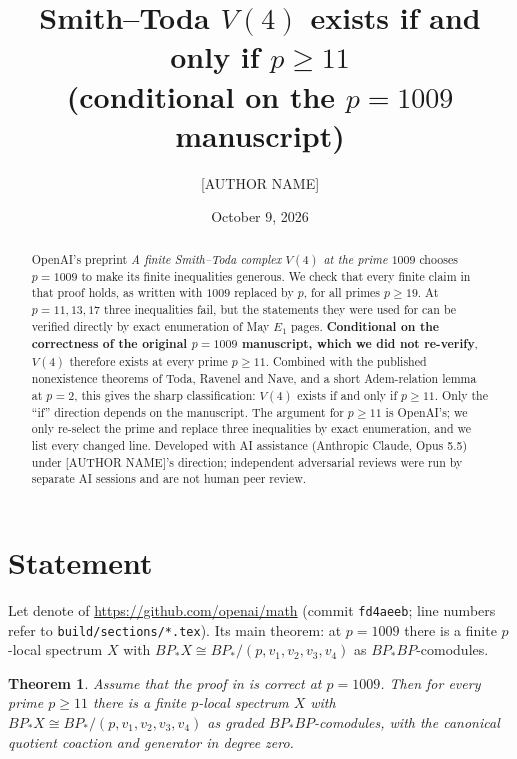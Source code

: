 \documentclass[11pt]{amsart}
\title{Smith--Toda $V(4)$ exists if and only if $p\ge11$\\ (conditional on the $p=1009$ manuscript)}
\author{[AUTHOR NAME]}
\date{October 9, 2026}
\newtheorem{theorem}{Theorem}
\theoremstyle{remark}
\begin{document}
\begin{abstract}
OpenAI's preprint \emph{A finite Smith--Toda complex $V(4)$ at the prime $1009$} chooses
$p=1009$ to make its finite inequalities generous. We check that every finite claim in that
proof holds, as written with $1009$ replaced by $p$, for all primes $p\ge19$. At
$p=11,13,17$ three inequalities fail, but the statements they were used for can be verified
directly by exact enumeration of May $E_1$ pages. \textbf{Conditional on the correctness of the
original $p=1009$ manuscript, which we did not re-verify}, $V(4)$ therefore exists at every prime
$p\ge11$. Combined with the published nonexistence theorems of Toda, Ravenel and Nave,
and a short Adem-relation lemma at $p=2$, this gives the sharp classification: $V(4)$ exists if and only
if $p\ge11$. Only the ``if'' direction depends on the manuscript. The argument for $p\ge11$ is OpenAI's; we only re-select the prime and replace three
inequalities by exact enumeration, and we list every changed line. Developed with AI assistance
(Anthropic Claude, Opus 5.5) under [AUTHOR NAME]'s direction; independent adversarial reviews
were run by separate AI sessions and are not human peer review.
\end{abstract}
\maketitle

\section{Statement}
Let \cite{OAI308} denote
of \url{https://github.com/openai/math} (commit \texttt{fd4aeeb}; line numbers refer to
\texttt{build/sections/*.tex}). Its main theorem: at $p=1009$ there is a finite $p$-local spectrum
$X$ with $BP_*X\cong BP_*/(p,v_1,v_2,v_3,v_4)$ as $BP_*BP$-comodules.

\begin{theorem}\label{thm}
Assume that the proof in \cite{OAI308} is correct at $p=1009$. Then for every prime $p\ge 11$ there is
a finite $p$-local spectrum $X$ with $BP_*X\cong BP_*/(p,v_1,v_2,v_3,v_4)$ as graded
$BP_*BP$-comodules, with the canonical quotient coaction and generator in degree zero.
\end{theorem}
\end{document}

